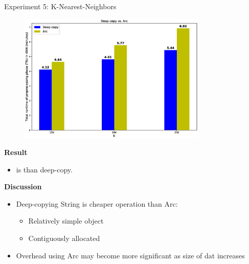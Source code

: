 \documentclass[9pt]{beamer}
\begin{document}
\begin{frame}[fragile]{Experiment 5: K-Nearest-Neighbors}
    \vspace{-0.5cm}
    \begin{figure}[hp]
        \centering
        \begin{center}
                \includegraphics[width=0.8\textwidth]{images/deepcopy_vs_arc.eps}
                \captionsetup{labelformat=empty}
        \end{center}
    \end{figure} 
    \vspace{-0.7cm}
    \textbf{Result}
    \begin{itemize}
        \item {} is  than deep-copy.
    \end{itemize}

    \textbf{Discussion}
    \begin{itemize}
        \item Deep-copying String is cheaper operation than Arc: 
        \begin{itemize}
            \item Relatively simple object
            \item Contiguously allocated
        \end{itemize}
        \item Overhead using Arc may become more significant as size of dat increases
    \end{itemize} 
\end{frame}
\end{document}

